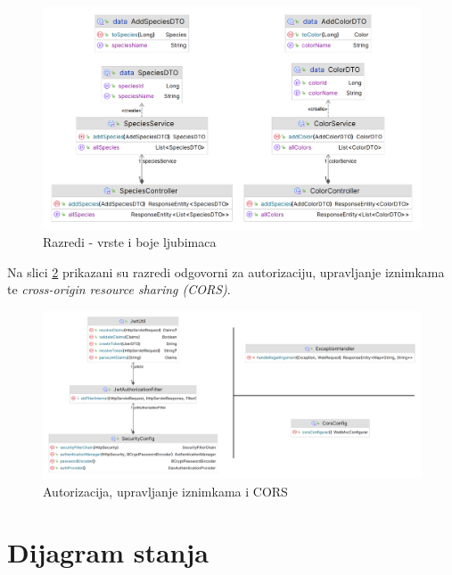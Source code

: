 			\begin{figure}[H]
				\includegraphics[scale=0.3]{slike/class_species_color.PNG} 
				\centering
				\caption{Razredi - vrste i boje ljubimaca}
				\label{class_species_color}
			\end{figure}
			
			Na slici \ref{class_security_exc_cors} prikazani su razredi odgovorni za autorizaciju, upravljanje iznimkama te \textit{cross-origin resource sharing (CORS)}.
			
			\begin{figure}[H]
				\includegraphics[scale=0.3]{slike/class_security_exc_cors.PNG} 
				\centering
				\caption{Autorizacija, upravljanje iznimkama i CORS}
				\label{class_security_exc_cors}
			\end{figure}
			
			\eject
		
		\section{Dijagram stanja}
			
